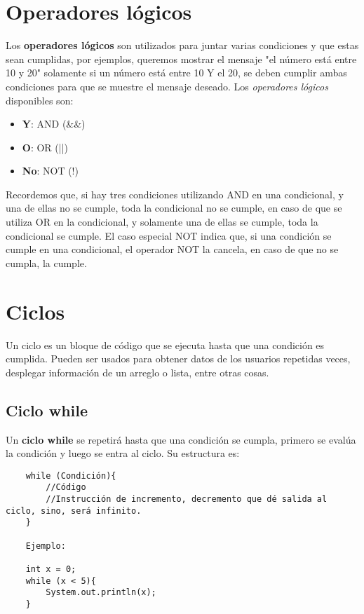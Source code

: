\section{Operadores lógicos}
\hspace{0.55cm}Los \textbf{operadores lógicos} son utilizados para juntar varias condiciones y que estas sean cumplidas, por ejemplos, queremos mostrar el mensaje "el número está entre 10 y 20" solamente si un número está entre 10 Y el 20, se deben cumplir ambas condiciones para que se muestre el mensaje deseado. Los \textit{operadores lógicos} disponibles son:
\begin{itemize}
    \item \textbf{Y}: AND (\&\&)
    \item \textbf{O}: OR (||)
    \item \textbf{No}: NOT (!)
\end{itemize}

Recordemos que, si hay tres condiciones utilizando AND en una condicional, y una de ellas no se cumple, toda la condicional no se cumple, en caso de que se utiliza OR en la condicional, y solamente una de ellas se cumple, toda la condicional se cumple. El caso especial NOT indica que, si una condición se cumple en una condicional, el operador NOT la cancela, en caso de que no se cumpla, la cumple.



\section{Ciclos}
\hspace{0.55cm}Un ciclo es un bloque de código que se ejecuta hasta que una condición es cumplida. Pueden ser usados para obtener datos de los usuarios repetidas veces, desplegar información de un arreglo o lista, entre otras cosas.


\subsection{Ciclo while}
\hspace{0.55cm}Un \textbf{ciclo while} se repetirá hasta que una condición se cumpla, primero se evalúa la condición y luego se entra al ciclo. Su estructura es:
\begin{lstlisting}
    while (Condición){
        //Código
        //Instrucción de incremento, decremento que dé salida al ciclo, sino, será infinito.
    }
    
    Ejemplo:
    
    int x = 0;
    while (x < 5){
        System.out.println(x);
    }
\end{lstlisting}


